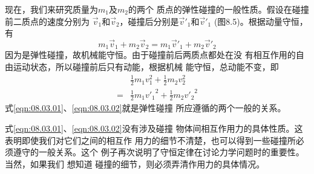 \documentclass[../outline-of-mechanics.tex]{subfiles}
\begin{document}
现在，我们来研究质量为$ m _ { 1 } $及$ m _ { 2 } $的两个
质点的弹性碰撞的一般性质。假设在碰撞前二质点的速度分别为
$ \vec{ v } _ { 1 } $和$ \vec{ v } _ { 2 } $，碰撞后分别是$ \vec{ v } ' _ { 1 } $和$ \vec{ v } ' _ { 1 } $
(图8.5)。根据动量守恒，有
\begin{equation}\label{eqn:08.03.01}
  m _ { 1 } \vec{ v } _ { 1 } + m _ { 2 } \vec{ v } _ { 2 } = m _ { 1 } \vec{ v } ' _ { 1 } + m _ { 2 } \vec{ v } ' _ { 2 }
\end{equation}
因为是弹性碰撞，故机械能守恒。由于碰撞前后两质点都处在没
有相互作用的自由运动状态，所以碰撞前后只有动能，根据机械
能守恒，总动能不变，即
\begin{equation}\label{eqn:08.03.02}
  \begin{split}
    & \frac { 1 } { 2 } m _ { 1 } v _ { 1 } ^ { 2 } + \frac { 1 } { 2 } m _ { 2 } v _ { 2 } ^ { 2 } \\
    = & \frac { 1 } { 2 } m _ { 1 } { v ' _ { 1 } } ^ { 2 } + \frac { 1 } { 2 } m _ { 2 } { v ' _ { 2 } } ^ { 2 }
  \end{split}
\end{equation}
式\eqref{eqn:08.03.01}、\eqref{eqn:08.03.02}就是弹性碰撞
所应遵循的两个一般的关系。

式\eqref{eqn:08.03.01}、\eqref{eqn:08.03.02}没有涉及碰撞
物体间相互作用力的具体性质。这表明即使我们对它们之间的相互作
用力的细节不清楚，也可以得到一些碰撞所必须遵守的一般关系。这个
例子再次说明了守恒定律在讨论力学问题时的重要性。当然，如果我们
想知道
碰撞的细节，则必须弄清作用力的具体情况。
\end{document}
